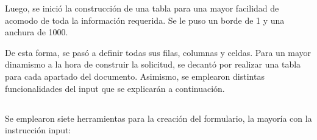\documentclass[10pt,a4paper]{article}
\begin{document}
Luego, se inició la construcción de una tabla para una mayor facilidad de acomodo de toda la información requerida. Se le puso un borde de 1 y una anchura de 1000.

De esta forma, se pasó a definir todas sus filas, columnas y celdas. Para un mayor dinamismo a la hora de construir la solicitud, se decantó por realizar una tabla para cada apartado del documento. Asimismo, se emplearon distintas funcionalidades del input que se explicarán a continuación.

\subsection{
	\textit{
		\color{colorESCOM}{Funcionalidades del Formulario}
	}
}

Se emplearon siete herramientas para la creación del formulario, la mayoría con la instrucción input:
\end{document}
